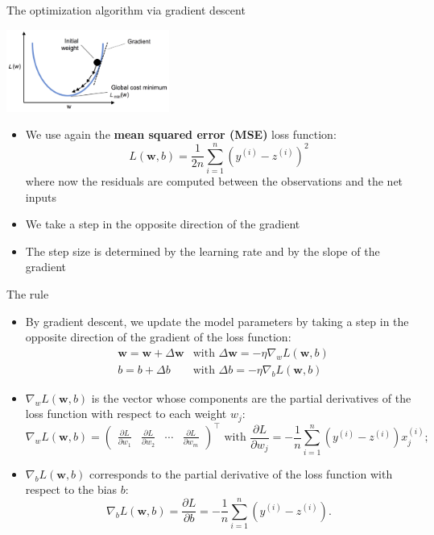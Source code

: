 \documentclass[aspectratio=169]{beamer}
\begin{document}
\begin{frame}{The optimization algorithm via gradient descent} 
	\begin{center}    
		\includegraphics[width=0.4\textwidth]{figures/02_10.png}
	\end{center}
	\begin{itemize}
		\item We use again the  \textbf{mean squared error (MSE)} loss function:
		\begin{equation*}
			L(\mathbf{w}, b) =  \frac{1}{2n}\sum_{i=1}^{n}\left(y^{(i)}-z^{(i)}\right)^2
		\end{equation*}
		where now the residuals are computed between the observations and the net inputs
		\item We take a step in the opposite direction of the gradient
		\item The step size is determined by the learning rate and by the slope of the gradient
	\end{itemize}
\end{frame}


\begin{frame}{The rule}
	\begin{itemize}
		\item By gradient descent, we update the model parameters by taking a step in the opposite direction of the gradient of the loss function:
		\begin{align*}
			&\mathbf{w} = \mathbf{w} + \Delta \mathbf{w} &\mbox{with }\Delta \mathbf{w}  = -\eta \nabla_{w}L(\mathbf{w}, b) \\
			&b = b + \Delta b &\mbox{with }\Delta b = -\eta \nabla_{b}L(\mathbf{w}, b)
		\end{align*}
		\item $\nabla_{w}L(\mathbf{w}, b)$ is the vector whose components are the partial derivatives of the loss function with respect to each weight $w_j$:
		\begin{equation*}
			\nabla_{w}L(\mathbf{w}, b) = \begin{pmatrix}
				\frac{\partial L}{\partial w_1} & \frac{\partial L}{\partial w_2}  & \cdots & \frac{\partial L}{\partial w_m} \end{pmatrix}^\top \mbox{ with }
			\frac{\partial L}{\partial w_j} = -\frac{1}{n} \sum_{i=1}^{n}\left(y^{(i)}-z^{(i)}\right) x_j^{(i)};
		\end{equation*}
		\item $\nabla_{b}L(\mathbf{w}, b)$ corresponds to the partial derivative of the loss function with respect to the bias $b$:
		\begin{equation*}
			\nabla_{b}L(\mathbf{w}, b) =  \frac{\partial L}{\partial b} = -\frac{1}{n} \sum_{i=1}^{n}\left(y^{(i)}-z^{(i)}\right).
		\end{equation*}
	\end{itemize}
\end{frame}
\end{document}
